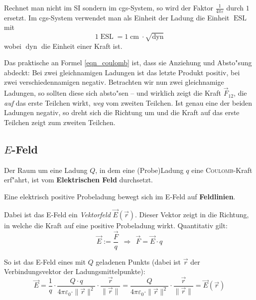 Rechnet man nicht im SI sondern im cgs-System, so wird der Faktor
$\frac{1}{4\pi\varepsilon}$ durch $1$ ersetzt. Im cgs-System verwendet
man als Einheit der Ladung die Einheit $\operatorname{ESL}$ mit
\begin{equation}
   \label{eq:172}
   1\operatorname{ESL} = 1 \operatorname{cm} \cdot \sqrt{\operatorname{dyn}}
\end{equation}
wobei $\operatorname{dyn}$ die Einheit einer Kraft ist.


\bigskip


Das praktische an Formel \eqref{eqn_coulomb} ist, dass sie Anziehung
und Absto"sung abdeckt: Bei zwei gleichnamigen Ladungen ist das letzte
Produkt positiv, bei zwei verschiedennamigen negativ. Betrachten wir
nun zwei gleichnamige Ladungen, so sollten diese sich absto"sen -- und
wirklich zeigt die Kraft $\vec F_{12}$, die \emph{auf} das erste Teilchen
wirkt, \emph{weg} vom zweiten Teilchen. Ist genau eine der beiden
Ladungen negativ, so dreht sich die Richtung um und die Kraft auf das
erste Teilchen zeigt zum zweiten Teilchen.





\subsection{$E$-Feld}
\label{kap_e-feld}

\begin{Def}[E-Feld]
   Der Raum um eine Ladung $Q$, in dem eine (Probe)Ladung $q$ eine
   \textsc{Coulomb}-Kraft erf"ahrt, ist vom \textbf{Elektrischen Feld} durchsetzt.

   Eine elektrisch positive Probeladung bewegt sich im E-Feld auf
   \textbf{Feldlinien}.
\end{Def}

Dabei ist das E-Feld ein \emph{Vektorfeld} $\vec E(\vec r)$. Dieser
Vektor zeigt in die Richtung, in welche die Kraft auf eine positive
Probeladung wirkt. Quantitativ gilt:
\begin{equation}
   \label{eqn_e-feld}
\vec E := \frac{\vec F}{q}
~ ~ \Rightarrow ~ ~
\boxed{
\vec F = \vec E \cdot q
}
\end{equation}

So ist das E-Feld eines mit $Q$ geladenen Punkts (dabei ist $\vec r$
der Verbindungsvektor der Ladungsmittelpunkte):
\begin{equation}
   \label{eq:173}
   \vec E =  \frac{1}{q} \cdot \frac{Q \cdot q }{4\pi\varepsilon_0 \cdot
     \|\vec r\|^2} \cdot \frac{\vec r}{\|\vec r\|} =
\frac{Q}{4\pi\varepsilon_0 \cdot
     \|\vec r\|^2} \cdot \frac{\vec r}{\|\vec r\|} = \vec E(\vec r)
\end{equation}


